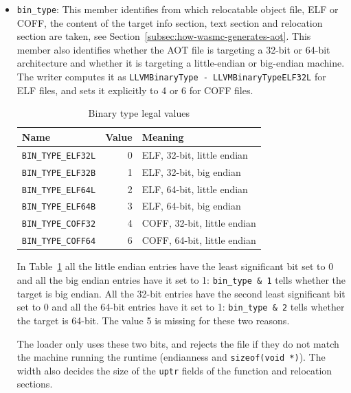 \documentclass{article}
\begin{document}
\begin{itemize}
    \item \verb|bin_type|:
        This member identifies from which relocatable object file, ELF or COFF, the content of the target info section, text section and relocation section are taken, see Section~\ref{subsec:how-wasmc-generates-aot}.
        This member also identifies whether the AOT file is targeting a 32-bit or 64-bit architecture and whether it is targeting a little-endian or big-endian machine.
        The writer computes it as \verb|LLVMBinaryType - LLVMBinaryTypeELF32L| for ELF files, and sets it explicitly to 4 or 6 for COFF files.

        \begin{table}[H]
        \centering
        \begin{tabular}{lrl}
            \hline
            Name & Value & Meaning \\
            \hline
            \verb|BIN_TYPE_ELF32L| & 0 & ELF,  32-bit, little endian \\
            \verb|BIN_TYPE_ELF32B| & 1 & ELF,  32-bit, big endian \\
            \verb|BIN_TYPE_ELF64L| & 2 & ELF,  64-bit, little endian \\
            \verb|BIN_TYPE_ELF64B| & 3 & ELF,  64-bit, big endian \\
            \verb|BIN_TYPE_COFF32| & 4 & COFF, 32-bit, little endian \\
            \verb|BIN_TYPE_COFF64| & 6 & COFF, 64-bit, little endian \\
            \hline
        \end{tabular}
        \caption{Binary type legal values}
        \label{table:bin-type-legal-value}
        \end{table}

        In Table~\ref{table:bin-type-legal-value} all the little endian entries have the least significant bit set to 0 and all the big endian entries have it set to 1:
        \verb|bin_type & 1| tells whether the target is big endian.
        All the 32-bit entries have the second least significant bit set to 0 and all the 64-bit entries have it set to 1:
        \verb|bin_type & 2| tells whether the target is 64-bit.
        The value 5 is missing for these two reasons.

        The loader only uses these two bits, and rejects the file if they do not match the machine running the runtime (endianness and \verb|sizeof(void *)|).
        The width also decides the size of the \verb|uptr| fields of the function and relocation sections.


\end{itemize}
\end{document}
